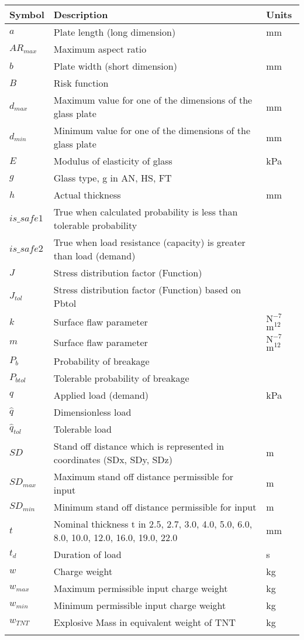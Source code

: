 \documentclass[12pt]{article}
\begin{document}
\begin{longtable*}{l l l}
\toprule
Symbol & Description & Units
\\
\midrule
$a$ & Plate length (long dimension) & mm
\\
$AR_{max}$ & Maximum aspect ratio & 
\\
$b$ & Plate width (short dimension) & mm
\\
$B$ & Risk function & 
\\
$d_{max}$ & Maximum value for one of the dimensions of the glass plate & mm
\\
$d_{min}$ & Minimum value for one of the dimensions of the glass plate & mm
\\
$E$ & Modulus of elasticity of glass & kPa
\\
$g$ & Glass type, g in {AN, HS, FT} & 
\\
$h$ & Actual thickness & mm
\\
$is\_safe1$ & True when calculated probability is less than tolerable probability & 
\\
$is\_safe2$ & True when load resistance (capacity) is greater than load (demand) & 
\\
$J$ & Stress distribution factor (Function) & 
\\
$J_{tol}$ & Stress distribution factor (Function) based on Pbtol & 
\\
$k$ & Surface flaw parameter & $\text{N}^{-7}$$\text{m}^{12}$
\\
$m$ & Surface flaw parameter & $\text{N}^{-7}$$\text{m}^{12}$
\\
$P_{b}$ & Probability of breakage & 
\\
$P_{btol}$ & Tolerable probability of breakage & 
\\
$q$ & Applied load (demand) & kPa
\\
$\hat{q}$ & Dimensionless load & 
\\
$\hat{q}_{tol}$ & Tolerable load & 
\\
$SD$ & Stand off distance which is represented in coordinates (SDx, SDy, SDz) & m
\\
$SD_{max}$ & Maximum stand off distance permissible for input & m
\\
$SD_{min}$ & Minimum stand off distance permissible for input & m
\\
$t$ & Nominal thickness t in {2.5, 2.7, 3.0, 4.0, 5.0, 6.0, 8.0, 10.0, 12.0, 16.0, 19.0, 22.0} & mm
\\
$t_{d}$ & Duration of load & s
\\
$w$ & Charge weight & kg
\\
$w_{max}$ & Maximum permissible input charge weight & kg
\\
$w_{min}$ & Minimum permissible input charge weight & kg
\\
$w_{TNT}$ & Explosive Mass in equivalent weight of TNT & kg
\\
\bottomrule
\label{Table:ToS}
\end{longtable*}
\end{document}

